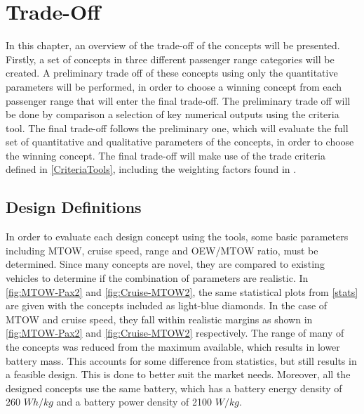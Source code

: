 \newpage
\chapter{Trade-Off}
\label{ch-tradeoff}


In this chapter, an overview of the trade-off of the concepts will be presented. Firstly, a set of concepts in three different passenger range categories will be created. A preliminary trade off of these concepts using only the quantitative parameters will be performed, in order to choose a winning concept from each passenger range that will enter the final trade-off. The preliminary trade off will be done by comparison a selection of key numerical outputs using the criteria tool. The final trade-off follows the preliminary one, which will evaluate the full set of quantitative and qualitative parameters of the concepts, in order to choose the winning concept. The final trade-off will make use of the trade criteria defined in \autoref{CriteriaTools}, including the weighting factors found in . 

\section{Design Definitions}
In order to evaluate each design concept using the tools, some basic parameters including MTOW, cruise speed, range and OEW/MTOW ratio, must be determined. Since many concepts are novel, they are compared to existing vehicles to determine if the combination of parameters are realistic. In \autoref{fig:MTOW-Pax2} and \autoref{fig:Cruise-MTOW2}, the same statistical plots from \autoref{stats} are given with the concepts included as light-blue diamonds. In the case of MTOW and cruise speed, they fall within realistic margins as shown in \autoref{fig:MTOW-Pax2} and \autoref{fig:Cruise-MTOW2} respectively. The range of many of the concepts was reduced from the maximum available, which results in lower battery mass. This accounts for some difference from statistics, but still results in a feasible design. This is done to better suit the market needs. Moreover, all the designed concepts use the same battery, which has a battery energy density of 260 $Wh/kg$ and a battery power density of 2100 $W/kg$.

